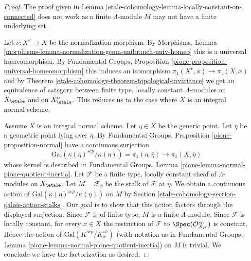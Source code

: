 \begin{proof}
The proof given in Lemma \ref{etale-cohomology-lemma-locally-constant-on-connected}
does not work as a finite $\Lambda$-module $M$ may not have a finite
underlying set.

\medskip\noindent
Let $\nu : X^\nu \to X$ be the normalization morphism. By Morphisms, Lemma
\ref{morphisms-lemma-normalization-geom-unibranch-univ-homeo}
this is a universal homeomorphism. By
Fundamental Groups, Proposition \ref{pione-proposition-universal-homeomorphism}
this induces an isomorphism
$\pi_1(X^\nu, \overline{x}) \to \pi_1(X, \overline{x})$
and by Theorem \ref{etale-cohomology-theorem-topological-invariance} we get
an equivalence of category between finite type, locally constant
$\Lambda$-modules on $X_\etale$ and on $X^\nu_\etale$.
This reduces us to the case where $X$ is an integral normal scheme.

\medskip\noindent
Assume $X$ is an integral normal scheme. Let $\eta \in X$ be the generic point.
Let $\overline{\eta}$ be a geometric point lying over $\eta$.
By Fundamental Groups, Proposition \ref{pione-proposition-normal}
have a continuous surjection
$$
\text{Gal}(\kappa(\eta)^{sep}/\kappa(\eta)) = \pi_1(\eta, \overline{\eta})
\longrightarrow
\pi_1(X, \overline{\eta})
$$
whose kernel is described in Fundamental Groups, Lemma
\ref{pione-lemma-normal-pione-quotient-inertia}.
Let $\mathcal{F}$ be a finite type, locally constant sheaf of $\Lambda$-modules
on $X_\etale$. Let $M = \mathcal{F}_{\overline{\eta}}$
be the stalk of $\mathcal{F}$ at $\overline{\eta}$.
We obtain a continuous action of $\text{Gal}(\kappa(\eta)^{sep}/\kappa(\eta))$
on $M$ by Section \ref{etale-cohomology-section-galois-action-stalks}.
Our goal is to show that this action factors through the
displayed surjection.
Since $\mathcal{F}$ is of finite type, $M$ is a finite $\Lambda$-module.
Since $\mathcal{F}$ is locally constant, for every $x \in X$
the restriction of $\mathcal{F}$ to $\Spec(\mathcal{O}_{X, x}^{sh})$
is constant. Hence the action of $\text{Gal}(K^{sep}/K_x^{sh})$
(with notation as in Fundamental Groups, Lemma
\ref{pione-lemma-normal-pione-quotient-inertia})
on $M$ is trivial. We conclude we have the factorization as desired.


\end{proof}
